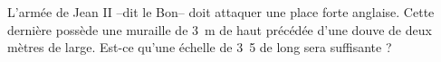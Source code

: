 
\begin{exercice}\label{exosmath-0833}

    L'armée de Jean II --dit le Bon-- doit attaquer une place forte anglaise. Cette dernière possède une muraille de \SI{3}{\meter} de haut précédée d'une douve de deux mètres de large. Est-ce qu'une échelle de \unit{3.5}{\meter} de long sera suffisante ?

\end{exercice}
